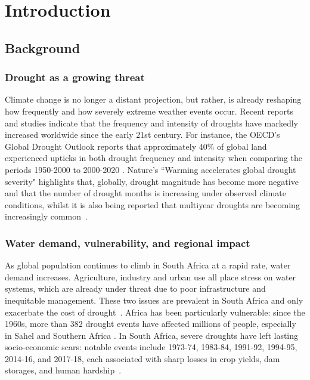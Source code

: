 \graphicspath{{introduction/fig/}}

\chapter{Introduction}
\label{chap:introduction}

\section{Background}

\subsection{Drought as a growing threat}

Climate change is no longer a distant projection, but rather, is already reshaping how frequently and how severely extreme weather events occur. Recent reports and studies indicate that the frequency and intensity of droughts have markedly increased worldwide since the early 21st century. For instance, the OECD’s Global Drought Outlook reports that approximately 40\% of global land experienced upticks in both drought frequency and intensity when comparing the periods 1950-2000 to 2000-2020 \cite{Tyndall_2025}. Nature's ``Warming accelerates global drought severity" highlights that, globally, drought magnitude has become more negative and that the number of drought months is increasing under observed climate conditions, whilst it is also being reported that multiyear droughts are becoming increasingly common~\cite{Gebrechorkos2025, Chen2025}.

\subsection{Water demand, vulnerability, and regional impact}

As global population continues to climb in South Africa at a rapid rate, water demand increases. Agriculture, industry and urban use all place stress on water systems, which are already under threat due to poor infrastructure and inequitable management. These two issues are prevalent in South Africa and only exacerbate the cost of drought~\cite{Olagunju19052019, Gebrechorkos2025}. Africa has been particularly vulnerable: since the 1960s, more than 382 drought events have affected millions of people, especially in Sahel and Southern Africa \cite{SHIFERAW201467, Tyndall_2025}. In South Africa, severe droughts have left lasting socio-economic scars: notable events include 1973-74, 1983-84, 1991-92, 1994-95, 2014-16, and 2017-18, each associated with sharp losses in crop yields, dam storages, and human hardship~\cite{Botai2017, socioeconomic_effects, BAUDOIN2017128, Sousa_2018}. 

